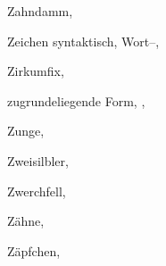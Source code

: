 \begin{theindex}
  \item Zahndamm, 
  \item Zeichen
    \subitem syntaktisch, 
    \subitem Wort--, 
  \item Zirkumfix, 
  \item zugrundeliegende Form, , 
  \item Zunge, 
  \item Zweisilbler, 
  \item Zwerchfell, 
  \item Zähne, 
  \item Zäpfchen, 

\end{theindex}
